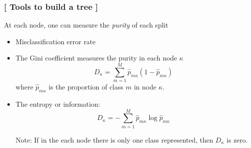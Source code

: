 \documentclass[xcolor=x11names,compress, handhouts]{beamer}
\renewcommand{\(}{\begin{columns}}
\renewcommand{\)}{\end{columns}}
\newcommand{\<}[1]{\begin{column}{#1}}
\renewcommand{\>}{\end{column}}
\begin{document}
\begin{frame}
\frametitle{\textcolor{brique}{[ Tools to build a tree ]}}
At each node, one can measure the \textit{purity} of each split
\pause
\begin{itemize}[<+->]
    \item  Misclassification error rate
    \item  The Gini coefficient measures the purity in each node $\kappa$
$$
  D_{\kappa} = \sum_{m=1}^M  \widehat{p}_{m \kappa} (1-\widehat{p}_{m
  \kappa})
$$
  where $\widehat{p}_{m \kappa}$ is the proportion of class $m$ in
  node $\kappa$.
    \item  The entropy or information:
 $$
  D_{\kappa} =   - \sum_{m=1}^M  \widehat{p}_{m \kappa}  \log
  \widehat{p}_{m \kappa}
  $$
  \item[Note:] If in the each node there is only one class   represented, then $D_{\kappa}$ is zero.

\end{itemize}
\end{frame}
\end{document}
